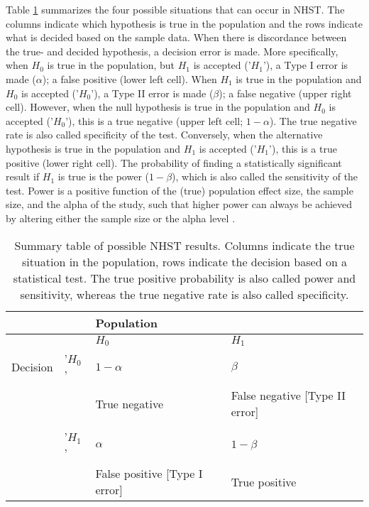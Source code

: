 \documentclass{article}
\begin{document}
Table \ref{tab:tab1} summarizes the four possible situations that can occur in NHST. The columns indicate which hypothesis is true in the population and the rows indicate what is decided based on the sample data. When there is discordance between the true- and decided hypothesis, a decision error is made. More specifically, when $H_0$ is true in the population, but $H_1$ is accepted ('$H_1$'), a Type I error is made ($\alpha$); a false positive (lower left cell). When $H_1$ is true in the population and $H_0$ is accepted ('$H_0$'), a Type II error is made ($\beta$); a false negative (upper right cell). However, when the null hypothesis is true in the population and $H_0$ is accepted ('$H_0$'), this is a true negative (upper left cell; $1-\alpha$). The true negative rate is also called specificity of the test. Conversely, when the alternative hypothesis is true in the population and $H_1$ is accepted ('$H_1$'), this is a true positive (lower right cell). The probability of finding a statistically significant result if $H_1$ is true is the power ($1-\beta$), which is also called the sensitivity of the test. Power is a positive function of the (true) population effect size, the sample size, and the alpha of the study, such that higher power can always be achieved by altering either the sample size or the alpha level \cite{Aberson2010-xa}. 

\begin{table}[htbp]
\caption{Summary table of possible NHST results. Columns indicate the true situation in the population, rows indicate the decision based on a statistical test. The true positive probability is also called power and sensitivity, whereas the true negative rate is also called specificity.}
\begin{adjustbox}{width=\textwidth,totalheight=\textheight,keepaspectratio,angle=0}
\centering
\begin{tabular}{llll}
&    & Population                        &                                    \\ \hline
&    & $H_0$                                & $H_1$                                 \\
Decision & '$H_0$' & $1-\alpha$                           & $\beta$                               \\
&    & True negative                     & False negative {[}Type II error{]} \\
& & & \\
& '$H_1$' & $\alpha$                             & $1-\beta$                             \\
&    & False positive {[}Type I error{]} & True positive                   \\  \hline
\end{tabular}
\end{adjustbox}
\label{tab:tab1}
\end{table}
\end{document}
